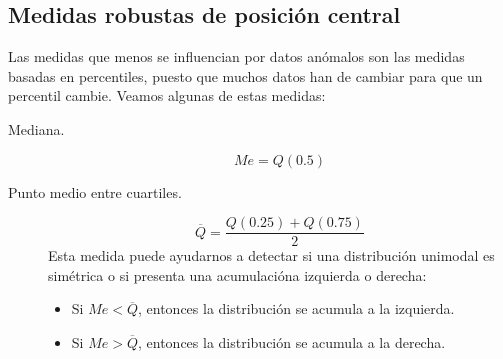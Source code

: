 \subsection{Medidas robustas de posición central}
\noindent
Las medidas que menos se influencian por datos anómalos son las medidas basadas en percentiles, puesto que muchos datos han de cambiar para que un percentil cambie. Veamos algunas de estas medidas:
\begin{description}
    \item [Mediana.] 
        \begin{equation*}
            Me = Q(0.5)
        \end{equation*}
    \item [Punto medio entre cuartiles.] 
        \begin{equation*}
            \overline{Q} = \frac{Q(0.25) + Q(0.75)}{2}
        \end{equation*}
        Esta medida puede ayudarnos a detectar si una distribución unimodal es simétrica o si presenta una acumulacióna izquierda o derecha:
        \begin{itemize}
            \item Si $Me < \overline{Q}$, entonces la distribución se acumula a la izquierda.
            \item Si $Me > \overline{Q}$, entonces la distribución se acumula a la derecha.
        \end{itemize}

        \begin{figure}[H]
        \centering
\end{figure}
\end{description}
